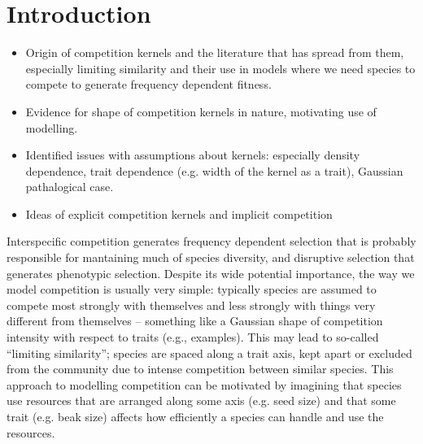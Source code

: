 \section{Introduction}

\begin{itemize}
\item Origin of competition kernels and the literature that has spread
  from them, especially limiting similarity and their use in models
  where we need species to compete to generate frequency dependent
  fitness.
\item Evidence for shape of competition kernels in nature, motivating
  use of modelling.
\item Identified issues with assumptions about kernels: especially
  density dependence, trait dependence (e.g. width of the kernel as a
  trait), Gaussian pathalogical case.
\item Ideas of explicit competition kernels and implicit competition
\end{itemize}

Interspecific competition generates frequency dependent selection that
is probably responsible for mantaining much of species diversity, and
disruptive selection that generates phenotypic selection.  Despite its
wide potential importance, the way we model competition is usually
very simple: typically species are assumed to compete most strongly
with themselves and less strongly with things very different from
themselves -- something like a Gaussian shape of competition intensity
with respect to traits (e.g., examples).
This may lead to so-called ``limiting similarity''; species are spaced
along a trait axis, kept apart or excluded from the community due to
intense competition between similar species.
This approach to modelling competition can be motivated by imagining
that species use resources that are arranged along some axis
(e.g. seed size) and that some trait (e.g. beak size) affects how
efficiently a species can handle and use the resources.

